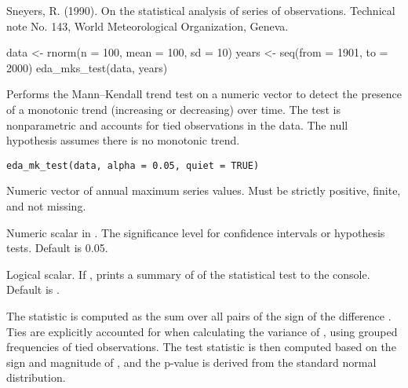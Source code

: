 \documentclass[a4paper]{book}
\begin{document}
%
\begin{References}
Sneyers, R. (1990). On the statistical analysis of series of observations.
Technical note No. 143, World Meteorological Organization, Geneva.
\end{References}
%
\begin{SeeAlso}
\end{SeeAlso}
%
\begin{Examples}
\begin{ExampleCode}
data <- rnorm(n = 100, mean = 100, sd = 10)
years <- seq(from = 1901, to = 2000)
eda_mks_test(data, years)

\end{ExampleCode}
\end{Examples}
%
\begin{Description}
Performs the Mann–Kendall trend test on a numeric vector to detect the presence
of a monotonic trend (increasing or decreasing) over time. The test is
nonparametric and accounts for tied observations in the data. The null
hypothesis assumes there is no monotonic trend.
\end{Description}
%
\begin{Usage}
\begin{verbatim}
eda_mk_test(data, alpha = 0.05, quiet = TRUE)
\end{verbatim}
\end{Usage}
%
\begin{Arguments}
\begin{ldescription}
\item[\code{data}] Numeric vector of annual maximum series values.
Must be strictly positive, finite, and not missing.

\item[\code{alpha}] Numeric scalar in \eqn{[0.01, 0.1]}{}. The significance
level for confidence intervals or hypothesis tests. Default is 0.05.

\item[\code{quiet}] Logical scalar. If , prints a summary of of the statistical
test to the console. Default is .
\end{ldescription}
\end{Arguments}
%
\begin{Details}
The statistic  is computed as the sum over all pairs  of the
sign of the difference . Ties are explicitly accounted for when
calculating the variance of , using grouped frequencies of tied observations.
The test statistic  is then computed based on the sign and magnitude of
, and the p-value is derived from the standard normal distribution.
\end{Details}
\end{document}
